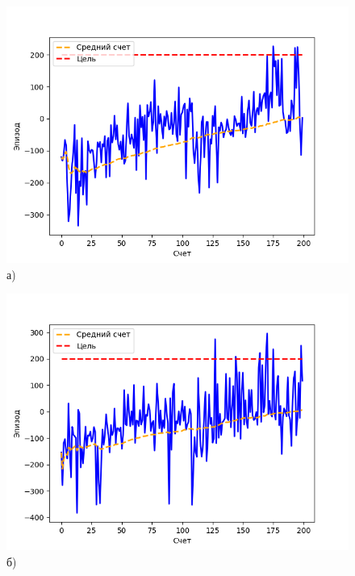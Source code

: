 \begin{figure}[ht]
	\begin{minipage}[b][][b]{0.49\linewidth}\centering
		\includegraphics[width=\linewidth]{figures/d3qn_train_score1} \\ а)
	\end{minipage}
	\hfill
	\begin{minipage}[b][][b]{0.49\linewidth}\centering
		\includegraphics[width=\linewidth]{figures/d3qn_train_score2} \\ б)
	\end{minipage}
	\vfill
	\begin{minipage}[b][][b]{0.49\linewidth}\centering

\end{minipage}
\end{figure}
